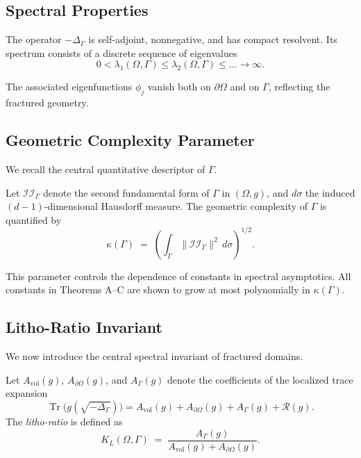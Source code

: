 \subsection{Spectral Properties}

\begin{proposition}
The operator $-\Delta_\Gamma$ is self-adjoint, nonnegative, and has compact
resolvent. Its spectrum consists of a discrete sequence of eigenvalues
\[
0 < \lambda_1(\Omega,\Gamma) \leq \lambda_2(\Omega,\Gamma) \leq \dots \to \infty.
\]
\end{proposition}

The associated eigenfunctions $\phi_j$ vanish both on $\partial\Omega$ and on
$\Gamma$, reflecting the fractured geometry.

\subsection{Geometric Complexity Parameter}

We recall the central quantitative descriptor of $\Gamma$.

\begin{definition}
Let $\mathcal{I\!I}_\Gamma$ denote the second fundamental form of $\Gamma$ in
$(\Omega,g)$, and $d\sigma$ the induced $(d-1)$-dimensional Hausdorff measure.
The geometric complexity of $\Gamma$ is quantified by
\[
\kappa(\Gamma) \;=\;
\left( \int_\Gamma \|\mathcal{I\!I}_\Gamma\|^2 \, d\sigma \right)^{1/2}.
\]
\end{definition}

This parameter controls the dependence of constants in spectral asymptotics.
All constants in Theorems A–C are shown to grow at most polynomially in
$\kappa(\Gamma)$.

\subsection{Litho-Ratio Invariant}

We now introduce the central spectral invariant of fractured domains.

\begin{definition}
Let $A_{\mathrm{vol}}(g)$, $A_{\partial\Omega}(g)$, and $A_\Gamma(g)$ denote
the coefficients of the localized trace expansion
\[
\operatorname{Tr}\big(g(\sqrt{-\Delta_\Gamma})\big)
= A_{\mathrm{vol}}(g) + A_{\partial\Omega}(g) + A_\Gamma(g) + \mathcal{R}(g).
\]
The \emph{litho-ratio} is defined as
\[
K_L(\Omega,\Gamma) \;=\; \frac{A_\Gamma(g)}{A_{\mathrm{vol}}(g) + A_{\partial\Omega}(g)}.
\]
\end{definition}

